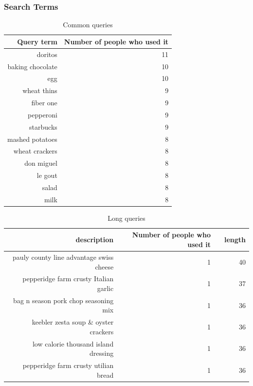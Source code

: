 \subsubsection{Search Terms}
\begin{table}[bthp]
\small
  \centering
  \caption{Common queries}
    \begin{tabular}{rr}
    \toprule
    Query term & Number of people who used it \\
    \midrule
    doritos & 11 \\
    baking chocolate & 10 \\
    egg   & 10 \\
    wheat thins & 9 \\
    fiber one & 9 \\
    pepperoni & 9 \\
    starbucks & 9 \\
    mashed potatoes & 8 \\
    wheat crackers & 8 \\
    don miguel & 8 \\
    le gout & 8 \\
    salad & 8 \\
    milk  & 8 \\
    \bottomrule
    \end{tabular}%
  \label{tab:inlab_commonqueries}%
\end{table}%


\begin{table}[htbp]
\small
  \centering
  \caption{Long queries}
    \begin{tabular}{rrrr}
    \toprule
    description & Number of people who used it &       & length  \\
    \midrule
    pauly county line advantage swiss cheese & 1     &       & 40 \\
    pepperidge farm crusty Italian garlic & 1     &       & 37 \\
    bag n season pork chop seasoning mix & 1     &       & 36 \\
    keebler zesta soup \& oyster crackers & 1     &       & 36 \\
    low calorie thousand island dressing & 1     &       & 36 \\
    pepperidge farm crusty utilian bread & 1     &       & 36 \\
    \bottomrule
    \end{tabular}%
  \label{tab:inlabLongQueries}%
\end{table}%


